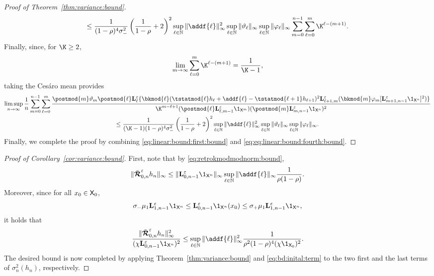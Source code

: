 \begin{proof}[Proof of Theorem~\ref{thm:variance:bound}]
\begin{multline}
\leq \frac{1}{(1 - \rho)^4 \udlow^2}  \left( \frac{1}{1 - \rho} + 2 \right)^2 \sup_{\ell \in \nset} \| \addf{\ell} \|_\infty^2 \sup_{\ell \in \nset} \| \adjfuncforward{\ell} \|_\infty \sup_{\ell \in \nset} \| \varphi_\ell \|_\infty \sum_{m = 0}^{n - 1} \sum_{\ell = 0}^m \K^{\ell - (m + 1)}. 
\end{multline}
Finally, since, for $\K \geq 2$, 
$$
\lim_{m \to \infty} \sum_{\ell = 0}^m \K^{\ell - (m + 1)} = \frac{1}{\K - 1}, 
$$
taking the Ces\'{a}ro mean provides  
\begin{multline} \label{eq:eq:linear:bound:fourth:bound}
\limsup_{n \to \infty} \frac{1}{n}  \sum_{m = 0}^{n - 1} \sum_{\ell = 0}^m \frac{\postmod{m} \adjfuncforward{m} \postmod{\ell} \ukmod{\ell} \{\bkmod{\ell}(\tstatmod{\ell} h_{\ell} + \addf{\ell} - \tstatmod{\ell + 1} h_{\ell +1})^2 \ukmod{\ell + 1, m}( \bkmod{m} \varphi_m [\ukmod{m + 1, n - 1} \1_{\Xset^n}]^2
)\}}{\K^{m - \ell + 1} (\postmod{\ell} \ukmod{\ell, m - 1} \1_{\Xset^m})(\postmod{m} \ukmod{m, n - 1} \1_{\Xset^n})^2} \\ 
\leq \frac{1}{(\K - 1) (1 - \rho)^4 \udlow^2}  \left( \frac{1}{1 - \rho} + 2 \right)^2 \sup_{\ell \in \nset} \| \addf{\ell} \|_\infty^2 \sup_{\ell \in \nset} \| \adjfuncforward{\ell} \|_\infty \sup_{\ell \in \nset} \| \varphi_\ell \|_\infty. 
\end{multline}
Finally, we complete the proof by combining \eqref{eq:linear:bound:first:bound} and \eqref{eq:eq:linear:bound:fourth:bound}. 
\end{proof}

\begin{proof}[Proof of Corollary~\ref{cor:variance:bound}]
First, note that by \eqref{eq:retrokmodmodnorm:bound}, 
$$
\|\retrokmodmodnorm_{0, n} h_n \|_\infty \leq \| \ukmod{0, n - 1} \1_{\Xset^n} \|_\infty \sup_{\ell \in \nset} \|\addf{\ell} \|_\infty  \frac{1}{\rho(1 - \rho)}. 
$$
Moreover, since for all $x_0 \in \mathsf{X}_0$, 
\begin{equation} \label{eq:ukmod:zero:upper:lower:bound}
\udlow \mu_1 \ukmod{1, n - 1} \1_{\Xset^n} \leq \ukmod{0, n - 1} \1_{\Xset^n}(x_0) \leq \udup \mu_1 \ukmod{1, n - 1} \1_{\Xset^n}, 
\end{equation}
it holds that 
\begin{equation}\label{eq:bd:inital:term}
\frac{\|\retrokmodmodnorm_{0, n} h_n \|_\infty^2}{(\chi \ukmod{0, n - 1} \1_{\Xset^n})^2} \leq \sup_{\ell \in \nset} \|\addf{\ell} \|_\infty^2  \frac{1}{\rho^2(1 - \rho)^4 (\chi \1_{\Xset_0})^2}. 
\end{equation}
The desired bound is now completed by applying Theorem~\ref{thm:variance:bound} and \eqref{eq:bd:inital:term} to the two first and the last terms of $\sigma_n^2(h_n)$, respectively.
\end{proof}

